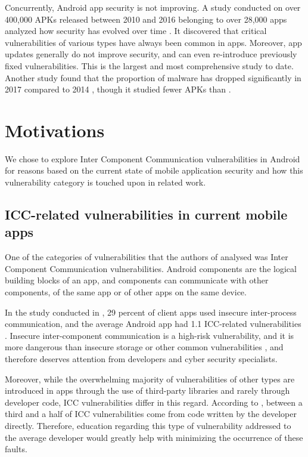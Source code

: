         Concurrently, Android app security is not improving. A study conducted on over 400,000 APKs released between 2010 and 2016 belonging to over 28,000 apps analyzed how security has evolved over time \cite{android_vulnerabilities_evolution}. It discovered that critical vulnerabilities of various types have always been common in apps. Moreover, app updates generally do not improve security, and can even re-introduce previously fixed vulnerabilities. This is the largest and most comprehensive study to date. Another study found that the proportion of malware has dropped significantly in 2017 compared to 2014 \cite{newer_android_vulnerabilities_evolution}, though it studied fewer APKs than \cite{android_vulnerabilities_evolution}.
		
	\section{Motivations}
	    \label{sec:intro_motivations}
	    
	    We chose to explore Inter Component Communication vulnerabilities in Android for reasons based on the current state of mobile application security and how this vulnerability category is touched upon in related work.
	    
	    \subsection{ICC-related vulnerabilities in current mobile apps}
	        \label{subsec:ICC_vulnerabilities_current_apps}
	    
    	One of the categories of vulnerabilities that the authors of \cite{pt_mobile_apps_2019} analysed was Inter Component Communication vulnerabilities. Android components are the logical building blocks of an app, and components can communicate with other components, of the same app or of other apps on the same device.
    	
    	In the study conducted in \cite{pt_mobile_apps_2019}, 29 percent of client apps used insecure inter-process communication, and the average Android app had 1.1 ICC-related vulnerabilities \cite{pt_mobile_apps_2019}. Insecure inter-component communication is a high-risk vulnerability, and it is more dangerous than insecure storage or other common vulnerabilities \cite{pt_mobile_apps_2019}, and therefore deserves attention from developers and cyber security specialists.
		
		Moreover, while the overwhelming majority of vulnerabilities of other types are introduced in apps through the use of third-party libraries and rarely through developer code, ICC vulnerabilities differ in this regard. According to \cite{android_vulnerabilities_evolution}, between a third and a half of ICC vulnerabilities come from code written by the developer directly. Therefore, education regarding this type of vulnerability addressed to the average developer would greatly help with minimizing the occurrence of these faults.
		
